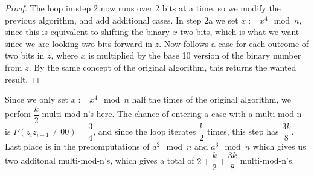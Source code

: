 \documentclass[paper=a4, fontsize=11pt]{scrartcl} %
\numberwithin{equation}{section} %
\numberwithin{figure}{section} %
\numberwithin{table}{section} %
\begin{document}
\begin{proof}
The loop in step 2 now runs over 2 bits at a time, so we modify the previous algorithm, and add additional cases. In step 2a we set $x:=x^4\mod{n}$, since this is equivalent to shifting the binary $x$ two bits, which is what we want since we are looking two bits forward in $z$. Now follows a case for each outcome of two bits in $z$, where $x$ is multiplied by the base 10 version of the binary number from $z$. By the same concept of the original algorithm, this returns the wanted result.  
\end{proof}

Since we only set $x:=x^4\mod{n}$ half the times of the original algorithm, we perfom $\dfrac{k}{2}$ multi-mod-n's here. The chance of entering a case with a multi-mod-n is $P(z_iz_{i-1}\not=00)=\dfrac{3}{4}$, and since the loop iterates $\dfrac{k}{2}$ times, this step has $\dfrac{3k}{8}$. Last place is in the precomputations of $a^2\mod{n}$ and $a^3\mod{n}$ which gives us two additonal multi-mod-n's, which gives a total of $2+\dfrac{k}{2}+\dfrac{3k}{8}$ multi-mod-n's.
\end{document}
